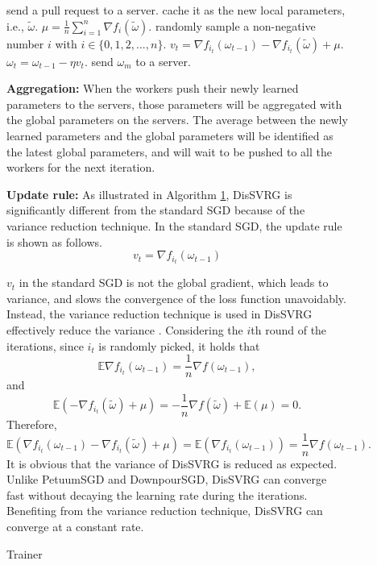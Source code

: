 \documentclass[preprint,review,11pt,a4paper]{elsarticle}
\begin{document}
\begin{figure}
\begin{algorithm}[t]
    \caption{Trainer}
    \label{algorithm_dis_svrg_trainer}
    \begin{algorithmic}[1]
            \State send a pull request to a server.
                    \State cache it as the new local parameters, i.e., $\tilde{\omega}$.
                    \State $\mu=\frac{1}{n}\sum\limits_{i=1}^n\nabla f_i(\tilde{\omega})$.
                       \State randomly sample a non-negative number $i$ with $i\in\{0,1, 2,...,n\}$.
	              \State $v_t=\nabla f_{i_t}(\omega_{t-1})-\nabla f_{i_t}(\tilde{\omega})+\mu$.
	              \State $\omega_t=\omega_{t-1}-\eta v_t$.
                    \EndFor
                    \State send  $\omega_m$ to a server.
               \EndIf
        \EndWhile
      \EndWhile
    \end{algorithmic}
\end{algorithm}

\textbf{Aggregation:} When the workers push their newly learned parameters to the servers, those parameters will be aggregated with the global parameters on the servers. The average between the newly learned parameters and the global parameters will be identified as the latest global parameters, and will wait to be pushed to all the workers for the next iteration.

\textbf{Update rule:} As illustrated in Algorithm \ref{algorithm_dis_svrg_trainer}, DisSVRG is significantly different from the standard SGD because of the variance reduction technique. In the standard SGD, the update rule is shown as follows.
\begin{equation}
\label{standard_sgd}
v_t=\nabla f_{i_t}(\omega_{t-1})
\end{equation}

$v_t$ in the standard SGD is not the global gradient, which leads to variance, and slows the convergence of the loss function unavoidably. Instead, the variance reduction technique is used in DisSVRG effectively reduce the variance \cite{Johnson:9MAvkbgy}. Considering the $i$th round of the iterations, since $i_t$ is randomly picked, it holds that
\begin{equation}
\mathbb{E}\nabla f_{i_t}(\omega_{t-1})=\frac{1}{n}\nabla f(\omega_{t-1}),
\end{equation}
and
\begin{equation}
\mathbb{E}(-\nabla f_{i_t}(\tilde{\omega})+\mu)=-\frac{1}{n} \nabla f(\tilde{\omega})+\mathbb{E}(\mu)=0.
\end{equation}
Therefore,
\begin{equation}
\mathbb{E}(\nabla f_{i_t}(\omega_{t-1})-\nabla f_{i_t}(\tilde{\omega})+\mu)=\mathbb{E}(\nabla f_{i_t}(\omega_{t-1}))=\frac{1}{n}\nabla f(\omega_{t-1}).
\end{equation}
It is obvious that the variance of DisSVRG is reduced as expected. Unlike PetuumSGD and DownpourSGD, DisSVRG can converge fast without decaying the learning rate during the iterations. Benefiting from the variance reduction technique, DisSVRG  can converge at a constant rate.


\end{figure}
\end{document}
